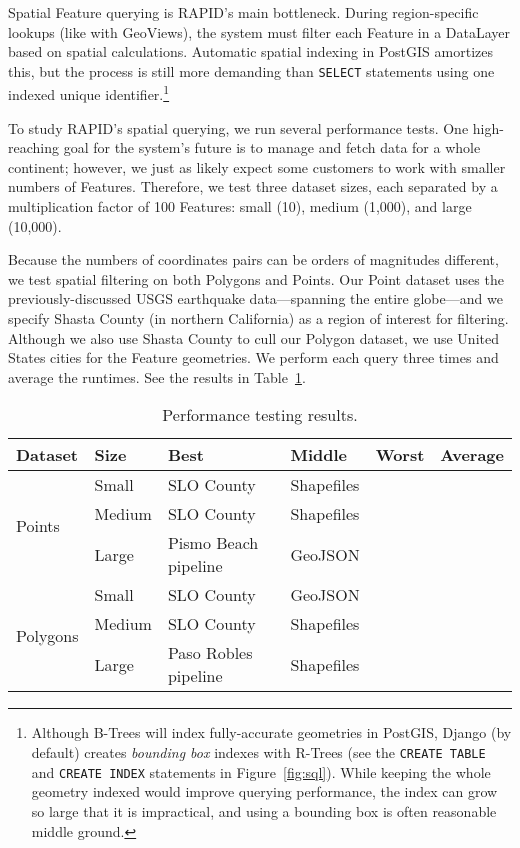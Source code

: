 Spatial Feature querying is RAPID's main bottleneck. During region-specific lookups (like with GeoViews), the system must filter each Feature in a DataLayer based on spatial calculations. Automatic spatial indexing in PostGIS amortizes this, but the process is still more demanding than \texttt{SELECT} statements using one indexed unique identifier.\footnote{Although B-Trees will index fully-accurate geometries in PostGIS, Django (by default) creates \textit{bounding box} indexes with R-Trees (see the \texttt{CREATE TABLE} and \texttt{CREATE INDEX} statements in Figure~\ref{fig:sql}). While keeping the whole geometry indexed would improve querying performance, the index can grow so large that it is impractical, and using a bounding box is often reasonable middle ground.}

To study RAPID's spatial querying, we run several performance tests. One high-reaching goal for the system's future is to manage and fetch data for a whole continent; however, we just as likely expect some customers to work with smaller numbers of Features. Therefore, we test three dataset sizes, each separated by a multiplication factor of 100 Features: small (10), medium (1,000), and large (10,000).

Because the numbers of coordinates pairs can be orders of magnitudes different, we test spatial filtering on both Polygons and Points. Our Point dataset uses the previously-discussed USGS earthquake data---spanning the entire globe---and we specify Shasta County (in northern California) as a region of interest for filtering. Although we also use Shasta County to cull our Polygon dataset, we use United States cities for the Feature geometries. We perform each query three times and average the runtimes. See the results in Table~\ref{table:tests}.

\begin{table}[ht]
\centering

    \begin{tabular}{ |l|l|l|l|l|l| }
        \hline
        Dataset & Size & Best & Middle & Worst & Average\\
        \hline
        \multirow{3}{*}{Points}
         & Small & SLO County & Shapefiles \\ \cline{2-6}
         & Medium & SLO County & Shapefiles \\ \cline{2-6}
         & Large & Pismo Beach pipeline & GeoJSON \\ \hline
        \multirow{3}{*}{Polygons}
         & Small & SLO County & GeoJSON \\ \cline{2-6}
        & Medium & SLO County & Shapefiles \\ \cline{2-6}
         & Large & Paso Robles pipeline & Shapefiles \\ \hline
    \end{tabular}
    
    \caption{Performance testing results.}
    \label{table:tests}
\end{table}

